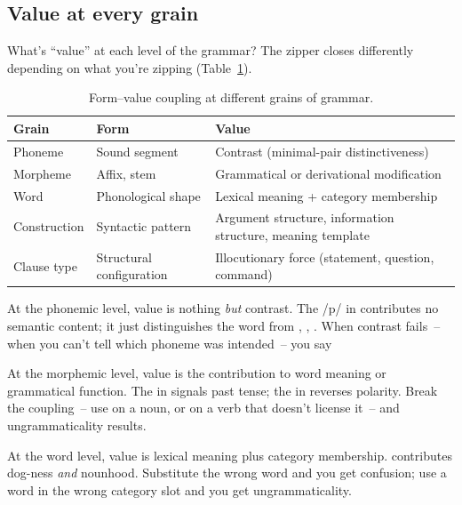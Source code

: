 \subsection{Value at every grain}
\label{sec:14:value-every-grain}

What's \enquote{value} at each level of the grammar? The zipper closes differently depending on what you're zipping (Table~\ref{tab:form-value-grains}).

\begin{table}[h]
\centering
\small
\begin{tabular}{@{}lll@{}}
\toprule
\textbf{Grain} & \textbf{Form} & \textbf{Value} \\
\midrule
Phoneme & Sound segment & Contrast (minimal-pair distinctiveness) \\
Morpheme & Affix, stem & Grammatical or derivational modification \\
Word & Phonological shape & Lexical meaning + category membership \\
Construction & Syntactic pattern & Argument structure, information structure, meaning template \\
Clause type & Structural configuration & Illocutionary force (statement, question, command) \\
\bottomrule
\end{tabular}
\caption{Form--value coupling at different grains of grammar.}
\label{tab:form-value-grains}
\end{table}

At the phonemic level, value is nothing \emph{but} contrast. The /p/ in  contributes no semantic content; it just distinguishes the word from , , . When contrast fails~-- when you can't tell which phoneme was intended~-- you say 

At the morphemic level, value is the contribution to word meaning or grammatical function. The  in  signals past tense; the  in  reverses polarity. Break the coupling~-- use  on a noun, or  on a verb that doesn't license it~-- and ungrammaticality results.

At the word level, value is lexical meaning plus category membership.  contributes dog-ness \emph{and} nounhood. Substitute the wrong word and you get confusion; use a word in the wrong category slot and you get ungrammaticality.

